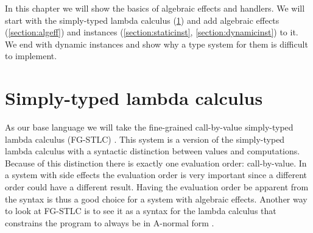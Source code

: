 {
\newcommand\eff[0]{\epsilon}

\newcommand\ty[0]{\tau}
\newcommand\tunit[0]{()}
\newcommand\tarr[2]{#1 \rightarrow #2}
\newcommand\thandler[2]{#1 \Rightarrow #2}
\newcommand\tforall[3]{\forall(#1:#2) . #3}
\newcommand\tinst[1]{\mathsf{inst}(#1)}

\newcommand\cty[0]{\underline{\ty}}
\newcommand\aty[2]{#1 \; ! \; #2}
\newcommand\texists[3]{\exists(#1:#2) . #3}
\newcommand\texistss[2]{\exists \overrightarrow{#1} . #2}
\newcommand\val[0]{\nu}
\newcommand\vunit[0]{()}
\newcommand\vinst[0]{\iota}
\newcommand\vabst[3]{\Lambda(#1:#2) . #3}
\newcommand\vabs[2]{\lambda #1 . #2}
\newcommand\vappt[2]{#1 \; [ #2 ]}

\newcommand\comp[0]{c}
\newcommand\creturn[1]{\mathsf{return} \; #1}
\newcommand\capp[2]{#1 \; #2}
\newcommand\cdo[3]{#1 \leftarrow #2 ; #3}
\newcommand\cop[2]{#1(#2)}
\newcommand\copi[3]{#1 \# #2(#3)}
\newcommand\chandle[2]{\mathsf{handle} (#1) \{ #2 \}}
\newcommand\chandlei[3]{\mathsf{handle}^{#1} (#2) \{ #3 \}}
\newcommand\cnew[1]{\mathsf{new} \; #1}
\newcommand\cunpack[4]{(#1, #2) \leftarrow #3 ; #4}

\newcommand\hop[5]{#1 \; #2 \; #3 \rightarrow #4 ; \; #5}
\newcommand\hreturn[2]{\mathsf{return}\; #1 \rightarrow #2}
\newcommand\hopc[4]{#1 \; #2 \; #3 \rightarrow #4}

In this chapter we will show the basics of algebraic effects and handlers. We will start with the simply-typed lambda calculus (\cref{section:stlc}) and add algebraic effects (\cref{section:algeff}) and instances (\cref{section:staticinst}, \cref{section:dynamicinst}) to it. We end with dynamic instances and show why a type system for them is difficult to implement.

\section{Simply-typed lambda calculus} \label{section:stlc}

As our base language we will take the fine-grained call-by-value simply-typed lambda calculus (FG-STLC) \cite{fg-stlc}.
This system is a version of the simply-typed lambda calculus with a syntactic distinction between values and computations.
Because of this distinction there is exactly one evaluation order: call-by-value.
In a system with side effects the evaluation order is very important since a different order could have a different result.
Having the evaluation order be apparent from the syntax is thus a good choice for a system with algebraic effects.
Another way to look at FG-STLC is to see it as a syntax for the lambda calculus that constrains the program to always be in A-normal form \cite{anormalform}.

}
